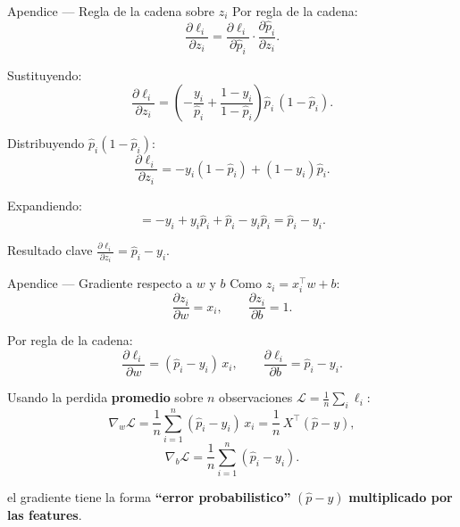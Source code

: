 \begin{frame}{Apendice — Regla de la cadena sobre $z_i$}
Por regla de la cadena:
\[
\frac{\partial \ell_i}{\partial z_i}
= \frac{\partial \ell_i}{\partial \hat p_i}\cdot\frac{\partial \hat p_i}{\partial z_i}.
\]

\vspace{0.2em}
Sustituyendo:
\[
\frac{\partial \ell_i}{\partial z_i}
= \left(-\frac{y_i}{\hat p_i} + \frac{1-y_i}{1-\hat p_i}\right)\hat p_i\,(1-\hat p_i).
\]

\vspace{0.2em}
Distribuyendo $\hat p_i(1-\hat p_i)$:
\[
\frac{\partial \ell_i}{\partial z_i}
= -y_i(1-\hat p_i) + (1-y_i)\hat p_i.
\]

\vspace{0.2em}
Expandiendo:
\[
= -y_i + y_i\hat p_i + \hat p_i - y_i\hat p_i
= \hat p_i - y_i.
\]

\vspace{0.2em}
\begin{block}{Resultado clave}
\centering
$\displaystyle \frac{\partial \ell_i}{\partial z_i} = \hat p_i - y_i.$
\end{block}
\end{frame}

\begin{frame}{Apendice — Gradiente respecto a $w$ y $b$}
Como $z_i = x_i^\top w + b$:
\[
\frac{\partial z_i}{\partial w} = x_i,\qquad
\frac{\partial z_i}{\partial b} = 1.
\]

\vspace{0.2em}
Por regla de la cadena:
\[
\frac{\partial \ell_i}{\partial w}
= (\hat p_i - y_i)\,x_i,
\qquad
\frac{\partial \ell_i}{\partial b}
= \hat p_i - y_i.
\]

\vspace{0.2em}
Usando la perdida \textbf{promedio} sobre $n$ observaciones $\mathcal{L} = \tfrac{1}{n}\sum_i\ell_i$:
\[
\nabla_w \mathcal{L}
= \frac{1}{n}\sum_{i=1}^n (\hat p_i - y_i)\,x_i
= \frac{1}{n}\,X^\top(\hat p - y),
\]
\[
\nabla_b \mathcal{L}
= \frac{1}{n}\sum_{i=1}^n (\hat p_i - y_i).
\]

\vspace{0.2em}
 el gradiente tiene la forma \textbf{``error probabilistico''} $(\hat p - y)$ \textbf{multiplicado por las features}.
\end{frame}
